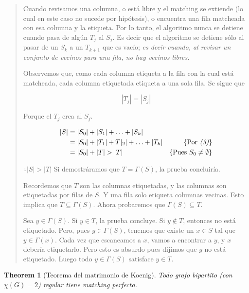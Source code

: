 \documentclass[a4paper]{article}
\newtheorem{theorem}{Theorem}
\newtheorem{theorem}{Theorem}
\begin{document}
\begin{quote}
Cuando revisamos una columna, o está libre y el matching se extiende (lo cual
en este caso no sucede por hipótesis), o encuentra una fila matcheada con esa
columna y la etiqueta. Por lo tanto, el algoritmo nunca se detiene cuando pasa
de algún $T_j$ al $S_j$. Es decir que el algoritmo se detiene sólo al pasar de
un $S_k$ a un $T_{k+1}$ que es vacío; \textit{es decir cuando, al revisar un
conjunto de vecinos para una fila, no hay vecinos libres.}

Observemos que, como cada columna etiqueta a la fila con la cual está
matcheada, cada columna etiquetada etiqueta a una sola fila. Se sigue que

\begin{equation}
    |T_j| = |S_j|
\end{equation}

Porque el $T_j$ crea al $S_j$. 

\begin{align*}
    |S| &= |S_0| + |S_1| + \ldots + |S_k|  \\ 
        &= |S_0| + |T_1| + T|_2| + \ldots + |T_k| & \left\{ \text{Por \textit{(3)}} \right\}  \\ 
        &= |S_0| + |T| > |T| &\left\{ \text{Pues } S_0 \neq \emptyset \right\} 
\end{align*}

$\therefore |S| > |T|$ Si demostráramos que $T = \Gamma(S)$, la prueba concluiría. 

Recordemos que $T$ son las columnas etiquetadas, y las columnas son etiquetadas
por filas de $S$. Y una fila solo etiqueta columnas vecinas. Esto implica que
$T \subseteq \Gamma(S)$. Ahora probaremos que $\Gamma(S) \subseteq T$.

Sea $y \in \Gamma(S)$. Si $y \in T$, la prueba concluye. Si $y \not\in T$,
entonces no está etiquetado. Pero, pues $y \in \Gamma(S)$, tenemos que existe
un $x \in S$ tal que $y \in \Gamma(x)$. Cada vez que escaneamos a $x$, vamos a
encontrar a $y$, y  $x$ debería etiquetarlo. Pero esto es absurdo pues dijimos
que $y$ no está etiquetado. Luego todo $y \in \Gamma(S)$ satisface $y \in T$.

\end{quote}
\normalsize

\begin{theorem}[Teorema del matrimonio de Koenig]
    Todo grafo bipartito (con $\chi(G) = 2$) regular tiene matching perfecto.
\end{theorem}
\end{document}
